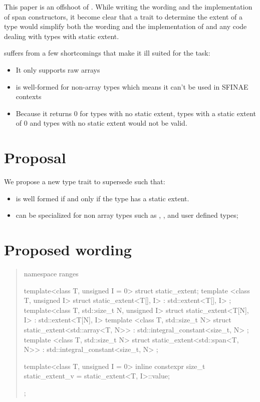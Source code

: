 \documentclass{wg21}
\begin{document}
This paper is an offshoot of \cite{P1394}. While writing the wording and the implementation of span constructors, it become clear that
a trait to determine the extent of a type would simplify both the wording and the implementation of  and any code 
dealing with types with static extent.

 suffers from a few shortcomings that make it ill suited for the task:

\begin{itemize}
	\item It only supports raw arrays
	\item {} is well-formed for non-array types which means it can't be used in SFINAE contexts
	\item Because it returns 0 for types with no static extent, types with a static extent of 0 and types with no static extent would not be valid.
\end{itemize}

\section{Proposal}

We propose a new type trait  to supersede  such that:

\begin{itemize}
	\item {} is well formed if and only if the type has a static extent.
	\item {} can be specialized for non array types such as  , , 
	and user defined types;
\end{itemize}


\section{Proposed wording}

\begin{quote}
\begin{codeblock}

namespace ranges {
	template<class T, unsigned I = 0>
	struct static_extent;
	template <class T, unsigned I>
	struct static_extent<T[], I> : std::extent<T[], I> {};
	template<class T, std::size_t N, unsigned I>
	struct static_extent<T[N], I> : std::extent<T[N], I> {}
	template <class T, std::size_t N>
	struct static_extent<std::array<T, N>> : std::integral_constant<size_t, N> {};
	template <class T, std::size_t N>
	struct static_extent<std::span<T, N>> : std::integral_constant<size_t, N> {};
	
	template<class T, unsigned I = 0>
	inline constexpr size_t static_extent_v = static_extent<T, I>::value;
};

\end{codeblock}
\end{quote}
\end{document}
